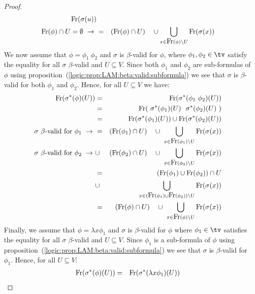 \begin{proof}
\begin{eqnarray*}
            \mbox{\rm Fr}(\sigma(u))\\
        \mbox{$\mbox{\rm Fr}(\phi)\cap U = \emptyset\ \rightarrow\ $} &=& 
            (\mbox{\rm Fr}(\phi)\cap U)\ \ \ \cup
            \bigcup_{x\in\mbox{\rm Fr}(\phi)\setminus U} \mbox{\rm Fr}(\sigma(x))
    \end{eqnarray*}
We now assume that $\phi=\phi_{1}\ \phi_{2}$ and $\sigma$ is $\beta$-valid 
for $\phi$, where $\phi_{1}, \phi_{2}\in\tv$ satisfy the equality for all 
$\sigma$ $\beta$-valid and $U\subseteq V$. Since both $\phi_{1}$ and $\phi_{2}$ 
are sub-formulas of $\phi$ using  
proposition~(\ref{logic:prop:LAM:beta:valid:subformula}) we see that $\sigma$
is $\beta$-valid for both $\phi_{1}$ and $\phi_{2}$. Hence, for all 
$U\subseteq V$ we have:
    \begin{eqnarray*}
        \free(\sigma^{*}(\phi)(U))
        &=&\free(\sigma^{*}(\phi_{1}\ \phi_{2})(U))\\
        &=&\free(\ \sigma^{*}(\phi_{1})(U)\ \ \sigma^{*}(\phi_{2})(U)\ )\\
        &=&\free(\sigma^{*}(\phi_{1})(U))\cup\free(\sigma^{*}(\phi_{2})(U))\\
        \mbox{$\sigma$ $\beta$-valid for $\phi_{1}\ \rightarrow\ $}
        &=&(\free(\phi_{1})\cap U)\ \ \ \cup\ 
            \bigcup_{x\in\free(\phi_{1})\setminus U} \free(\sigma(x))\\
        \mbox{$\sigma$ $\beta$-valid for $\phi_{2}\ \rightarrow\ $}
        &\cup&(\free(\phi_{2})\cap U)\ \ \ \cup\ 
            \bigcup_{x\in\free(\phi_{2})\setminus U} \free(\sigma(x))\\
        &=&(\free(\phi_{1})\cup\free(\phi_{2}))\cap U\\
        &\cup&\bigcup_{x\in(\free(\phi_{1})\cup\free(\phi_{2}))\setminus U}
            \free(\sigma(x))\\
        &=&(\free(\phi)\cap U)\ \ \ \cup\ \bigcup_{x\in\free(\phi)\setminus U}
            \free(\sigma(x))
    \end{eqnarray*}
Finally, we assume that $\phi=\lambda x\phi_{1}$ and $\sigma$ is $\beta$-valid
for $\phi$ where $\phi_{1}\in\tv$ satisfies the equality for all $\sigma$
$\beta$-valid and $U\subseteq V$. Since $\phi_{1}$ is a sub-formula of $\phi$
using proposition~(\ref{logic:prop:LAM:beta:valid:subformula}) we see that 
    $\sigma$ is $\beta$-valid for $\phi_{1}$. Hence, for all $U\subseteq V$:
    \begin{eqnarray*}
        \free(\sigma^{*}(\phi)(U))
        &=&\free(\sigma^{*}(\lambda x\phi_{1})(U))\\

\end{eqnarray*}
\end{proof}
